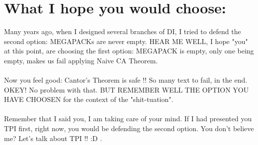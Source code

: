 	\section{What I hope you would choose:}
		
		\noindent
		Many years ago, when I designed several branches of DI, I tried to defend the second option: MEGAPACKs are never empty. HEAR ME WELL, I hope "you" at this point, are choosing the first option: MEGAPACK is empty, only one being empty, makes us fail applying Naive CA Theorem.
		\\\\
		
		\noindent
		Now you feel good: Cantor's Theorem is safe !! So many text to fail, in the end. OKEY! No problem with that. BUT REMEMBER WELL THE OPTION YOU HAVE CHOOSEN for the context of the "shit-tuation".
		\\\\
		
		\noindent
		Remember that I said you, I am taking care of your mind. If I had presented you TPI first, right now, you would be defending the second option. You don't believe me? Let's talk about TPI !! :D .
		